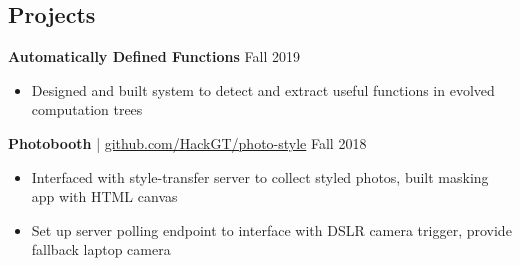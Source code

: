 \subsection*{Projects}
\iftoggle{research}{
    \headerrow
        {\textbf{Perturbome of Graphs of RNNs} | \href{https://github.com/joel99/noised-rnn-networks}{Report: github.com/joel99/noised-rnn-networks}}
        {Fall 2020}
    \begin{itemize}
        \item How do deep neural networks compute in the presence of internal noise, or targeted perturbation?
        \item Evaluated this dynamical robustness by noising recurrent networks built with \textsc{pytorch-geometric}
    \end{itemize}
    \headerrow
        {\textbf{BERT Representations During Fine-Tuning} | \href{https://github.com/joel99/bert-representations}{Report: github.com/joel99/bert-representations}}
        {Fall 2020}
    \begin{itemize}
        \item Studied how transformers change during fine-tuning and forgetting using representational analysis
    \end{itemize}
}{}
\headerrow
    {\textbf{Automatically Defined Functions}}
    {Fall 2019}
\begin{itemize}
    \item Designed and built system to detect and extract useful functions in evolved computation trees %
\end{itemize}
\iftoggle{dense}{}{
    \headerrow
        {\textbf{Filter Inverter} | \href{https://team-vision2020.github.io}{team-vision2020.github.io}}
        {Fall 2018}
    \begin{itemize}
        \item Unfilter Instagram filters using detection and pseudo-inversion. Created demo combining all models
        \item Designed voting procedure that used nearest neighbor classifier on generated knowledge base
    \end{itemize}
}
\headerrow
    {\textbf{Photobooth} | \href{https://github.com/HackGT/photo-style}{github.com/HackGT/photo-style}}
    {Fall 2018}
\begin{itemize}
    \item Interfaced with style-transfer server to collect styled photos, built masking app with HTML canvas
    \item Set up server polling endpoint to interface with DSLR camera trigger, provide fallback laptop camera
\end{itemize}
